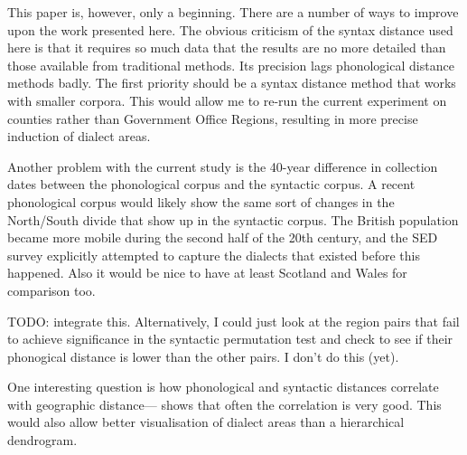 \documentclass[11pt]{article}
\begin{document}
This paper is, however, only a beginning. There are a number of ways to
improve upon the work presented here. The obvious criticism of the
syntax distance used here is that it requires so much data that the
results are no more detailed than those available from traditional
methods. Its precision lags phonological distance methods badly. The
first priority should be a syntax distance method that works with
smaller corpora. This would allow me to re-run the current experiment
on counties rather than Government Office Regions, resulting in more
precise induction of dialect areas.

Another problem with the current study is the 40-year difference in
collection dates between the phonological corpus and the syntactic
corpus. A recent phonological corpus would likely show the same sort
of changes in the North/South divide that show up in the syntactic
corpus. The British population became more mobile during the second
half of the 20th century, and the SED survey explicitly attempted to capture
the dialects that existed before this happened. Also it would be nice to have at
least Scotland and Wales for comparison too.

TODO: integrate this.
Alternatively, I could just look at the region pairs that fail to
achieve significance in the syntactic permutation test and check to
see if their phonogical distance is lower than the other pairs. I
don't do this (yet).

One interesting question is
how phonological and syntactic distances correlate with geographic
distance--- shows that often the correlation is
very good. This would also allow better visualisation of dialect areas
than a hierarchical dendrogram.



\end{document}
